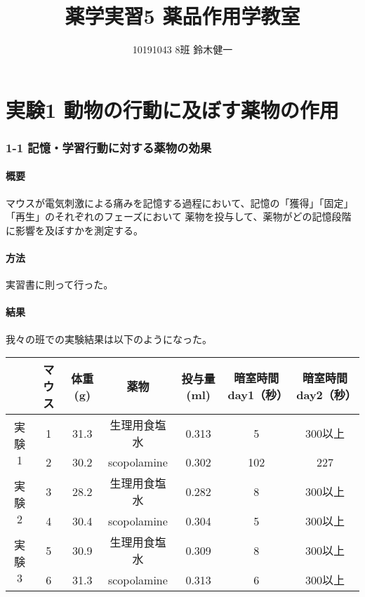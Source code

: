 \documentclass[a4paper,papersize,dvipdfmx]{jsarticle}
\begin{document}
\title{薬学実習5 薬品作用学教室}
\author{10191043 8班 鈴木健一}
\date{}
\maketitle


\part*{実験1 動物の行動に及ぼす薬物の作用}

\section*{1-1 記憶・学習行動に対する薬物の効果}

\subsection*{概要}
マウスが電気刺激による痛みを記憶する過程において、記憶の「獲得」「固定」「再生」のそれぞれのフェーズにおいて
薬物を投与して、薬物がどの記憶段階に影響を及ぼすかを測定する。

\subsection*{方法}
実習書に則って行った。

\subsection*{結果}
我々の班での実験結果は以下のようになった。

\begin{table}[H]
\centering
\begin{tabular}{|c|c|c|c|c|c|c|}
\hline
& マウス                  & 体重(g) & 薬物   & 投与量(ml)     & 暗室時間day1（秒） & 暗室時間day2（秒）       \\ \hline
\multirow{2}{*}{実験1} & 1     & 31.3 & 生理用食塩水      & 0.313       & 5           & 300以上 \\ \cline{2-7}
& 2     & 30.2 & scopolamine & 0.302       & 102         & 227   \\ \hline
\multirow{2}{*}{実験2} & 3     & 28.2 & 生理用食塩水      & 0.282       & 8           & 300以上 \\ \cline{2-7}
& 4     & 30.4 & scopolamine & 0.304       & 5           & 300以上 \\ \hline
\multirow{2}{*}{実験3} & 5     & 30.9 & 生理用食塩水      & 0.309       & 8           & 300以上 \\ \cline{2-7}
& 6     & 31.3 & scopolamine & 0.313       & 6           & 300以上 \\ \hline
\end{tabular}
\end{table}
\end{document}
